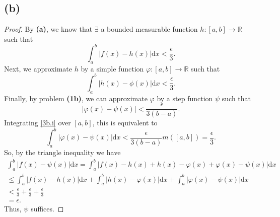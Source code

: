 \documentclass{article}
\newcommand{\R}{\mathbb{R}} %
\begin{document}
\subsection*{(b)}
\begin{proof}
	By \textbf{(a)}, we know that $\exists$ a bounded measurable function $h: [a, b] \to \R$ such that
	\begin{equation}
		\int_a^b |f(x) - h(x)| \mathrm{d}x < \frac{\epsilon}{3}.
	\end{equation}
	Next, we approximate $h$ by a simple function $\varphi: [a, b] \to \R$ such that
	\begin{equation}
		\int_a^b |h(x) - \phi(x)| \mathrm{d}x < \frac{\epsilon}{3}.
	\end{equation}
	Finally, by problem \textbf{(1b)}, we can approximate $\varphi$ by a step function $\psi$ such that
	\begin{equation}\label{3b.i}
		|\varphi(x) - \psi(x)| < \frac{\epsilon}{3(b-a)}.
	\end{equation}
	Integrating \eqref{3b.i} over $[a, b]$, this is equivalent to
	\begin{equation}
		\int_a^b |\varphi(x) - \psi(x)| \mathrm{d}x < \frac{\epsilon}{3(b-a)}m([a, b]) = \frac{\epsilon}{3}.
	\end{equation}
	So, by the triangle inequality we have
	\begin{align}
		\int_a^b |f(x) - \psi(x)| \mathrm{d}x = \int_a^b |f(x) - h(x) + h(x) - \varphi(x) + \varphi(x) - \psi(x)| \mathrm{d}x \\
		\leq \int_a^b |f(x) - h(x)| \mathrm{d}x + \int_a^b |h(x) - \varphi(x)| \mathrm{d}x + \int_a^b |\varphi(x) - \psi(x)|\mathrm{d}x \\
		< \frac{\epsilon}{3} + \frac{\epsilon}{3} + \frac{\epsilon}{3} \\
		= \epsilon.
	\end{align}
	Thus, $\psi$ suffices.
\end{proof}
\end{document}

